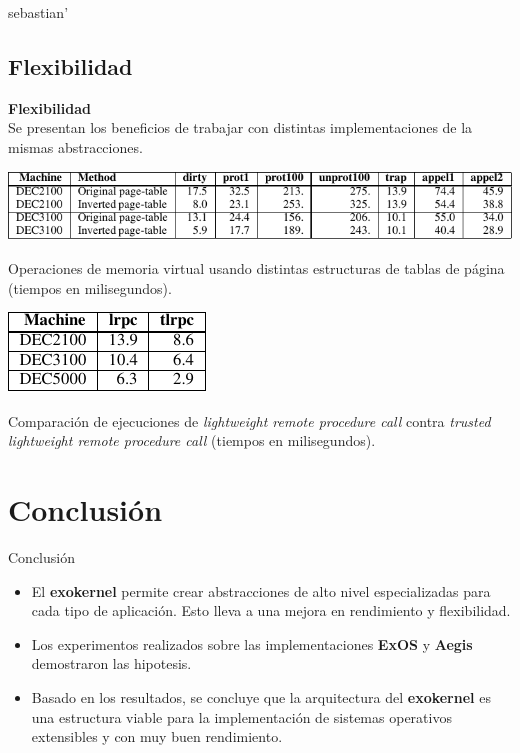 sebastian'\]\documentclass[10pt]{beamer}
\begin{document}
\subsection{Flexibilidad}

\begin{frame}
\textbf{Flexibilidad} \\[2em]
Se presentan los beneficios de trabajar con distintas implementaciones de la mismas abstracciones. 
\begin{table}
 \includegraphics[scale=0.8]{grafico-pages.pdf}
\caption{Operaciones de memoria virtual usando distintas estructuras de tablas de página (tiempos en milisegundos).}
\end{table}

\begin{table}
\includegraphics[scale=0.8]{grafico-tlrpc.pdf}
\caption{Comparación de ejecuciones de \emph{lightweight remote procedure call} contra \emph{trusted lightweight remote procedure call} (tiempos en milisegundos).}
\end{table}
\end{frame}

\section{Conclusión}

\begin{frame}{Conclusión}
\begin{itemize}
  \item El \textbf{exokernel} permite crear abstracciones de alto nivel especializadas para cada tipo de aplicación. Esto lleva a una mejora en rendimiento y flexibilidad.
  \item Los experimentos realizados sobre las implementaciones \textbf{ExOS} y \textbf{Aegis} demostraron las hipotesis.
  \item Basado en los resultados, se concluye que la arquitectura del \textbf{exokernel} es una estructura viable para la implementación de sistemas operativos extensibles y con muy buen rendimiento.
\end{itemize}
\end{frame}



\end{document}
